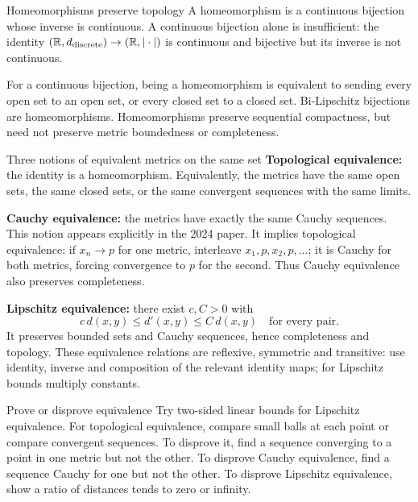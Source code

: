 \begin{note}{Homeomorphisms preserve topology}
A homeomorphism is a continuous bijection whose inverse is continuous. A continuous bijection alone is insufficient: the identity $(\mathbb R,d_{\rm discrete})\to(\mathbb R,|\cdot|)$ is continuous and bijective but its inverse is not continuous.

For a continuous bijection, being a homeomorphism is equivalent to sending every open set to an open set, or every closed set to a closed set. Bi-Lipschitz bijections are homeomorphisms. Homeomorphisms preserve sequential compactness, but need not preserve metric boundedness or completeness.
\end{note}
\begin{note}{Three notions of equivalent metrics on the same set}
\textbf{Topological equivalence:} the identity is a homeomorphism. Equivalently, the metrics have the same open sets, the same closed sets, or the same convergent sequences with the same limits.

\textbf{Cauchy equivalence:} the metrics have exactly the same Cauchy sequences. This notion appears explicitly in the 2024 paper. It implies topological equivalence: if $x_n\to p$ for one metric, interleave $x_1,p,x_2,p,\ldots$; it is Cauchy for both metrics, forcing convergence to $p$ for the second. Thus Cauchy equivalence also preserves completeness.

\textbf{Lipschitz equivalence:} there exist $c,C>0$ with
\[c\,d(x,y)\le d'(x,y)\le C\,d(x,y)\quad\text{for every pair}.\]
It preserves bounded sets and Cauchy sequences, hence completeness and topology. These equivalence relations are reflexive, symmetric and transitive: use identity, inverse and composition of the relevant identity maps; for Lipschitz bounds multiply constants.
\end{note}
\begin{method}{Prove or disprove equivalence}
Try two-sided linear bounds for Lipschitz equivalence. For topological equivalence, compare small balls at each point or compare convergent sequences. To disprove it, find a sequence converging to a point in one metric but not the other. To disprove Cauchy equivalence, find a sequence Cauchy for one but not the other. To disprove Lipschitz equivalence, show a ratio of distances tends to zero or infinity.
\end{method}
